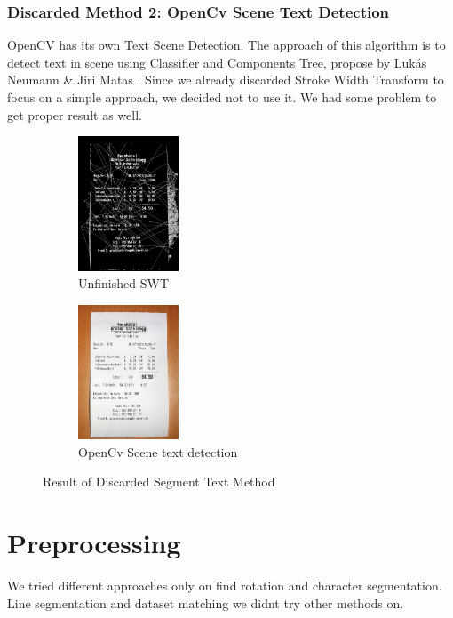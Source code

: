 \documentclass[Report.tex]{subfiles}
\begin{document}
\begin{flushleft}
  \subsubsection{Discarded Method 2: OpenCv Scene Text Detection}
  OpenCV has its own Text Scene Detection. The approach of this algorithm is to detect text in scene using Classifier and Components Tree, propose by Lukás Neumann \& Jiri Matas \cite{neumann_real-time_2012}. Since we already discarded Stroke Width Transform to focus on a simple approach, we decided not to use it. We had some problem to get proper result as well.
\end{flushleft}

\begin{figure}[ht]
  \centering
  \begin{subfigure}[t]{4cm}
    \includegraphics[width=3cm]{res/swt.png}
    \caption{Unfinished SWT}
  \end{subfigure}
  \hspace{5mm}%
  \begin{subfigure}[t]{4cm}
    \includegraphics[width=3cm]{res/OpenCV_Std.png}
    \caption{OpenCv Scene text detection}
  \end{subfigure}
  \hspace{5mm}%
  \caption{Result of Discarded Segment Text Method}
  \label{fig:Text_detection_result}
\end{figure}

\section{Preprocessing}
We tried different approaches only on find rotation and character segmentation. Line segmentation and dataset matching we didnt try other methods on.
\end{document}
